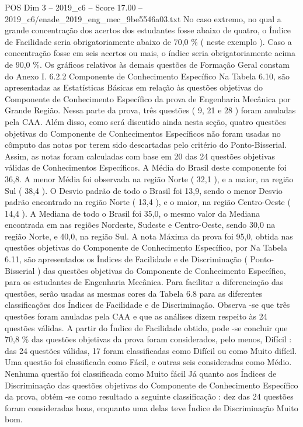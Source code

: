 \begin{textsample}{POS Dim 3 – 2019\_c6 – Score 17.00 – 2019\_c6/enade\_2019\_eng\_mec\_9be5546a03.txt}
No caso extremo, no qual a grande concentração dos acertos dos estudantes fosse abaixo de quatro, o Índice de Facilidade seria obrigatoriamente abaixo de 70,0 \% ( neste exemplo ).
Caso a concentração fosse em seis acertos ou mais, o índice seria obrigatoriamente acima de 90,0 \%.
Os gráficos relativos às demais questões de Formação Geral constam do Anexo I. 6.2.2 Componente de Conhecimento Específico Na Tabela 6.10, são apresentadas as Estatísticas Básicas em relação às questões objetivas do Componente de Conhecimento Específico da prova de Engenharia Mecânica por Grande Região.
Nessa parte da prova, três questões ( 9, 21 e 28 ) foram anuladas pela CAA.
Além disso, como será discutido ainda nesta seção, quatro questões objetivas do Componente de Conhecimentos Específicos não foram usadas no cômputo das notas por terem sido descartadas pelo critério do Ponto-Bisserial.
Assim, as notas foram calculadas com base em 20 das 24 questões objetivas válidas de Conhecimentos Específicos.
A Média do Brasil deste componente foi 36,8.
A menor Média foi observada na região Norte ( 32,1 ), e a maior, na região Sul ( 38,4 ).
O Desvio padrão de todo o Brasil foi 13,9, sendo o menor Desvio padrão encontrado na região Norte ( 13,4 ), e o maior, na região Centro-Oeste ( 14,4 ).
A Mediana de todo o Brasil foi 35,0, o mesmo valor da Mediana encontrada em nas regiões Nordeste, Sudeste e Centro-Oeste, sendo 30,0 na região Norte, e 40,0, na região Sul.
A nota Máxima da prova foi 95,0, obtida nas questões objetivas do Componente de Conhecimento Específico, por Na Tabela 6.11, são apresentados os Índices de Facilidade e de Discriminação ( Ponto-Bisserial ) das questões objetivas do Componente de Conhecimento Específico, para os estudantes de Engenharia Mecânica.
Para facilitar a diferenciação das questões, serão usadas as mesmas cores da Tabela 6.8 para as diferentes classificações dos Índices de Facilidade e de Discriminação.
Observa -se que três questões foram anuladas pela CAA e que as análises dizem respeito às 24 questões válidas.
A partir do Índice de Facilidade obtido, pode -se concluir que 70,8 \% das questões objetivas da prova foram considerados, pelo menos, Difícil : das 24 questões válidas, 17 foram classificadas como Difícil ou como Muito difícil.
Uma questão foi classificada como Fácil, e outras seis consideradas como Médio.
Nenhuma questão foi classificada como Muito fácil Já quanto aos Índices de Discriminação das questões objetivas do Componente de Conhecimento Específico da prova, obtém -se como resultado a seguinte classificação : dez das 24 questões foram consideradas boas, enquanto uma delas teve Índice de Discriminação Muito bom.

\end{textsample}
